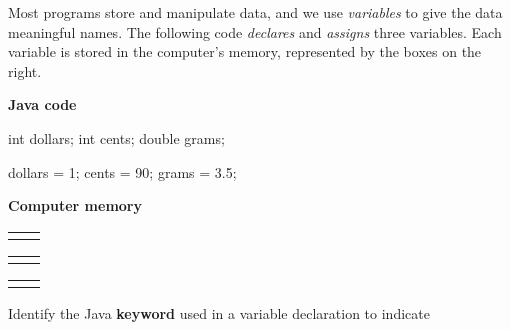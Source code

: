 
\label{variable}

Most programs store and manipulate data, and we use \textit{variables} to give the data meaningful names.
The following code \emph{declares} and \emph{assigns} three variables.
Each variable is stored in the computer's memory, represented by the boxes on the right.

\vspace{1em}
\begin{minipage}[t]{0.45\textwidth}

\begin{center}
\textbf{Java code}
\end{center}

\begin{javabox}
int dollars;
int cents;
double grams;

dollars = 1;
cents = 90;
grams = 3.5;
\end{javabox}

\end{minipage}
\hfill
\begin{minipage}[t]{0.45\textwidth}

\begin{center}
\textbf{Computer memory}
\end{center}

\begin{tabular}{R{50pt}|C{20pt}|}
 &  \\
\end{tabular}

\vspace{1em}

\begin{tabular}{R{50pt}|C{20pt}|}
 &  \\
\end{tabular}

\vspace{1em}

\begin{tabular}{R{50pt}|C{20pt}|}
 &  \\
\end{tabular}

\end{minipage}




\Q Identify the Java \textbf{keyword} used in a variable declaration to indicate

